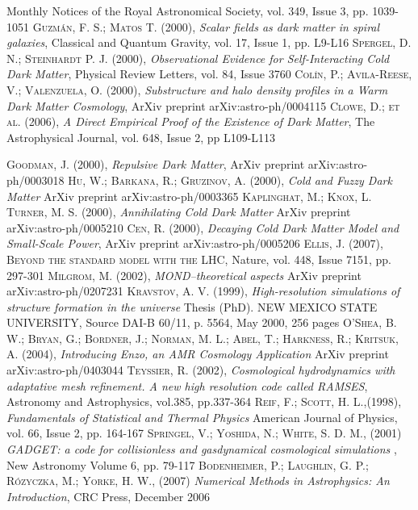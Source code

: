 \documentclass[a4paper,openright,12pt]{book}
\begin{document}
\begin{thebibliography}{a}
Monthly Notices of the Royal Astronomical Society, vol. 349, Issue 3, pp. 1039-1051
 \textsc{Guzmán, F. S.; Matos T. (2000)}, 
\textit{Scalar fields as dark matter in spiral galaxies},
Classical and Quantum Gravity, vol. 17, Issue 1, pp. L9-L16 
 \textsc{Spergel, D. N.; Steinhardt P. J. (2000)},
\textit{Observational Evidence for Self-Interacting Cold Dark Matter},
Physical Review Letters, vol. 84, Issue 3760
 \textsc{Colín, P.; Avila-Reese, V.; Valenzuela, O. (2000)},
\textit{Substructure and halo density profiles in a Warm Dark Matter Cosmology},
ArXiv preprint arXiv:astro-ph/0004115
 \textsc{Clowe, D.; et al. (2006)},
\textit{A Direct Empirical Proof of the Existence of Dark Matter},
The Astrophysical Journal, vol. 648, Issue 2, pp L109-L113
 
 \textsc{Goodman, J. (2000)},
\textit{Repulsive Dark Matter},
ArXiv preprint arXiv:astro-ph/0003018
 \textsc{Hu, W.; Barkana, R.; Gruzinov, A. (2000)},
\textit{Cold and Fuzzy Dark Matter}
ArXiv preprint arXiv:astro-ph/0003365
 \textsc{Kaplinghat, M.; Knox, L. Turner, M. S. (2000)},
\textit{Annihilating Cold Dark Matter}
ArXiv preprint arXiv:astro-ph/0005210
 \textsc{Cen, R. (2000)},
\textit{Decaying Cold Dark Matter Model and Small-Scale Power},
ArXiv preprint arXiv:astro-ph/0005206
 \textsc{Ellis, J. (2007)},
\textsc{Beyond the standard model with the LHC},
Nature, vol. 448, Issue 7151, pp. 297-301
 \textsc{Milgrom, M. (2002)},
\textit{MOND--theoretical aspects}
ArXiv preprint arXiv:astro-ph/0207231
 \textsc{Kravstov, A. V. (1999)},
\textit{High-resolution simulations of structure formation in the universe}
Thesis (PhD). NEW MEXICO STATE UNIVERSITY, Source DAI-B 60/11, p. 5564, May 2000, 256 pages
 \textsc{O'Shea, B. W.; Bryan, G.; Bordner, J.; Norman, M. L.; Abel, T.; Harkness, R.; Kritsuk, A. (2004)},
\textit{Introducing Enzo, an AMR Cosmology Application}
ArXiv preprint arXiv:astro-ph/0403044
 \textsc{Teyssier, R. (2002)},
\textit{Cosmological hydrodynamics with adaptative mesh refinement. A new high resolution code called RAMSES},
Astronomy and Astrophysics, vol.385, pp.337-364
 \textsc{Reif, F.; Scott, H. L.,(1998)},
\textit{Fundamentals of Statistical and Thermal Physics}
American Journal of Physics, vol. 66, Issue 2, pp. 164-167
 \textsc{Springel, V.; Yoshida, N.; White, S. D. M., (2001)}
\textit{GADGET: a code for collisionless and gasdynamical cosmological simulations },
New Astronomy Volume 6, pp. 79-117
 \textsc{Bodenheimer, P.; Laughlin, G. P.; Rózyczka, M.; Yorke, H. W., (2007)} 
\textit{Numerical Methods in Astrophysics: An Introduction},
CRC Press, December 2006


\end{thebibliography}
\end{document}
